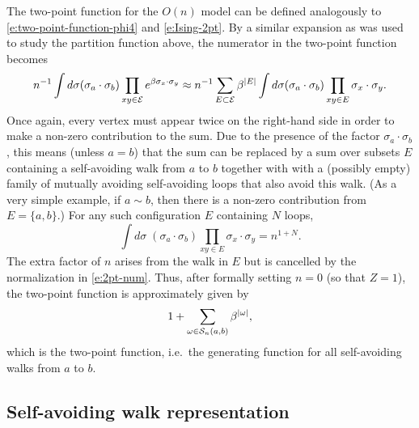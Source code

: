 The two-point function for the $O(n)$ model can be defined analogously to
\eqref{e:two-point-function-phi4} and \eqref{e:Ising-2pt}. By a similar expansion
as was used to study the partition function above, the numerator in the two-point
function becomes
\begin{equation}
\label{e:2pt-num}
n^{-1} \int d\sigma (\sigma_a \cdot \sigma_b) \prod_{xy\in\mathcal{E}} e^{\beta\sigma_x\cdot\sigma_y}
	\approx
n^{-1}
\sum_{E\subset\mathcal{E}} \beta^{|E|}
\int d\sigma (\sigma_a \cdot \sigma_b)
\prod_{xy\in E} \sigma_x \cdot \sigma_y.
\end{equation}
Once again, every vertex must appear twice on the right-hand side in order to make a
non-zero contribution to the sum. Due to the presence of the factor $\sigma_a \cdot \sigma_b$,
this means (unless $a = b$) that the sum can be replaced by a sum over subsets $E$ containing
a self-avoiding walk from $a$ to $b$ together with with a (possibly empty) family of mutually
avoiding self-avoiding loops that also avoid this walk. (As a very simple example, if $a \sim b$,
then there is a non-zero contribution from $E = \{ a, b \}$.) For any such configuration $E$
containing $N$ loops,
\begin{equation}
\int d\sigma \; (\sigma_a \cdot \sigma_b) \prod_{xy\in E} \sigma_x \cdot \sigma_y
	=
n^{1 + N}.
\end{equation}
The extra factor of $n$ arises from the walk in $E$ but is
cancelled by the normalization in \eqref{e:2pt-num}.
Thus, after formally setting $n = 0$ (so that $Z = 1$), the two-point function
is approximately given by
\begin{equation}
1 + \sum_{\omega\in\mathcal{S}_n(a, b)} \beta^{|\omega|},
\end{equation}
which is the two-point function, i.e.\ the generating function for all self-avoiding
walks from $a$ to $b$.


\subsection{Self-avoiding walk representation}
\label{sec:intrep}

